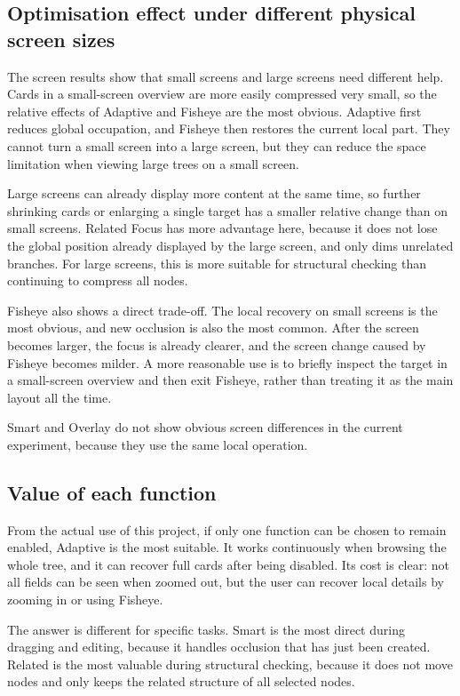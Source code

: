 \documentclass[11pt,a4paper,oneside,extrafontsizes]{memoir}
\begin{document}
\subsection{Optimisation effect under different physical screen sizes}

The screen results show that small screens and large screens need different help. Cards in a small-screen overview are more easily compressed very small, so the relative effects of Adaptive and Fisheye are the most obvious. Adaptive first reduces global occupation, and Fisheye then restores the current local part. They cannot turn a small screen into a large screen, but they can reduce the space limitation when viewing large trees on a small screen.

Large screens can already display more content at the same time, so further shrinking cards or enlarging a single target has a smaller relative change than on small screens. Related Focus has more advantage here, because it does not lose the global position already displayed by the large screen, and only dims unrelated branches. For large screens, this is more suitable for structural checking than continuing to compress all nodes.

Fisheye also shows a direct trade-off. The local recovery on small screens is the most obvious, and new occlusion is also the most common. After the screen becomes larger, the focus is already clearer, and the screen change caused by Fisheye becomes milder. A more reasonable use is to briefly inspect the target in a small-screen overview and then exit Fisheye, rather than treating it as the main layout all the time.

Smart and Overlay do not show obvious screen differences in the current experiment, because they use the same local operation.

\subsection{Value of each function}

From the actual use of this project, if only one function can be chosen to remain enabled, Adaptive is the most suitable. It works continuously when browsing the whole tree, and it can recover full cards after being disabled. Its cost is clear: not all fields can be seen when zoomed out, but the user can recover local details by zooming in or using Fisheye.

The answer is different for specific tasks. Smart is the most direct during dragging and editing, because it handles occlusion that has just been created. Related is the most valuable during structural checking, because it does not move nodes and only keeps the related structure of all selected nodes.
\end{document}
